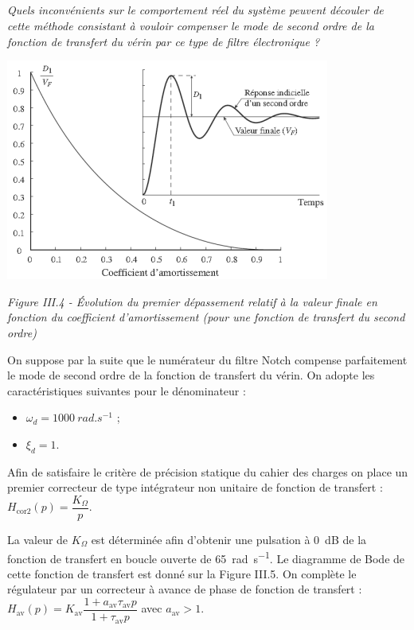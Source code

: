 \documentclass[10pt,fleqn]{article} %
\begin{document}
\begin{multicols}{2}
\subparagraph{}
\textit{Quels inconvénients sur le comportement réel du système peuvent découler de cette méthode consistant à vouloir compenser le mode de second ordre de la fonction de transfert du vérin par ce type de filtre électronique ?}
\ifprof
\begin{corrige}
\end{corrige}
\else
\fi

\begin{center}
\includegraphics[width=.6\linewidth]{images/pt_09}

\textit{Figure III.4 - Évolution du premier dépassement relatif à la valeur finale en fonction du coefficient d'amortissement (pour une fonction de transfert du second ordre)}
\end{center}

On suppose par la suite que le numérateur du filtre Notch compense parfaitement le mode de second ordre de la fonction de transfert du vérin. On adopte les caractéristiques suivantes pour le dénominateur :
\begin{itemize}
\item $\omega_d = \SI{1000}{rad.s^{-1}}$ ;
\item $\xi_d = 1$.
\end{itemize}

Afin de satisfaire le critère de précision statique du cahier des charges on place un premier correcteur de type intégrateur non unitaire de fonction de transfert :
$H_{\text{cor2}}(p)=\dfrac{K_{\Omega}}{p}$.

La valeur de $K_{\Omega}$ est déterminée afin d'obtenir une pulsation à \SI{0}{dB} de la fonction de transfert en boucle ouverte de \SI{65}{rad.s^{-1}}. Le diagramme de Bode de cette fonction de transfert est donné sur la Figure III.5.
On complète le régulateur par un correcteur à avance de phase de fonction de transfert :
$H_{\text{av}}(p)=K_{\text{av}}\dfrac{1+a_{\text{av}}\tau_{\text{av}}p}{1+\tau_{\text{av}}p}$ avec $a_{\text{av}}>1$.


\end{multicols}
\end{document}
